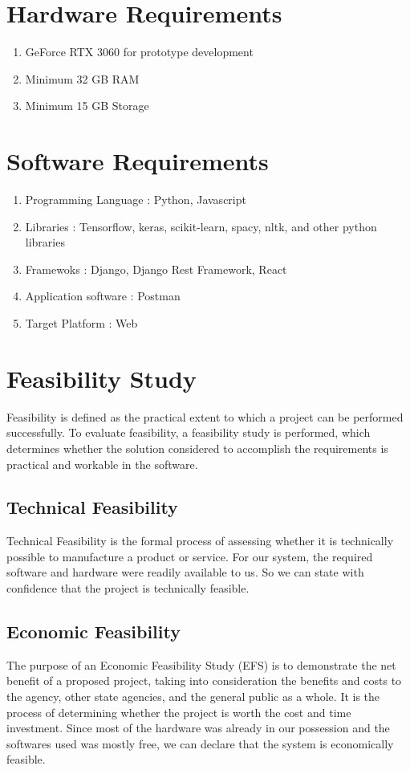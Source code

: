 \section{Hardware Requirements}
\begin{enumerate}
    \item GeForce RTX 3060 for prototype development 
    \item Minimum 32 GB RAM 
    \item Minimum 15 GB Storage
\end{enumerate}

\section{Software Requirements}
\begin{enumerate}
    \item Programming Language : Python, Javascript
    \item Libraries : Tensorflow, keras, scikit-learn, spacy, nltk, and other python libraries 
    \item Framewoks : Django, Django Rest Framework, React
    \item Application software : Postman
    \item Target Platform : Web 
\end{enumerate}

\section{Feasibility Study}
Feasibility is defined as the practical extent to which a project can be performed successfully. To evaluate feasibility, a feasibility study is performed, which determines whether the solution considered to accomplish the requirements is practical and workable in the software.


\subsection{Technical Feasibility}
Technical Feasibility is the formal process of assessing whether it is technically possible to manufacture a product or service. For our system, the required software and hardware were readily available to us. So we can state with confidence that the project is technically feasible.

\subsection{Economic Feasibility}
The purpose of an Economic Feasibility Study (EFS) is to demonstrate the net benefit of a proposed project, taking into consideration the benefits and costs to the agency, other state agencies, and the general public as a whole. It is the  process of determining whether the project  is worth the cost and time investment. Since most of the hardware was already in our possession and the softwares used was mostly free, we can declare that the system is economically feasible.

